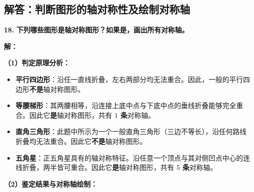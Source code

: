 \newpage

\newpage

\subsection{解答：判断图形的轴对称性及绘制对称轴}

\vspace{0.6cm}

\textbf{\LARGE 18.} \textbf{下列哪些图形是轴对称图形？如果是，画出所有对称轴。}

\vspace{0.4cm}
\textbf{解：}

\textbf{（1）判定原理分析：}
\begin{itemize}
    \item \textbf{平行四边形}：沿任一直线折叠，左右两部分均无法重合。因此，一般的平行四边形\textbf{不是}轴对称图形。
    \item \textbf{等腰梯形}：其两腰相等，沿连接上底中点与下底中点的垂线折叠能够完全重合。因此它\textbf{是}轴对称图形，共有 \textbf{$1$ 条}对称轴。
    \item \textbf{直角三角形}：此题中所示为一个一般直角三角形（三边不等长），沿任何路线折叠均无法重合。因此它\textbf{不是}轴对称图形。
    \item \textbf{五角星}：正五角星具有的轴对称特征。沿任意一个顶点与其对侧凹点中心的连线折叠，两半皆可重合。因此它\textbf{是}轴对称图形，共有 \textbf{$5$ 条}对称轴。
\end{itemize}

\textbf{（2）鉴定结果与对称轴绘制：}

